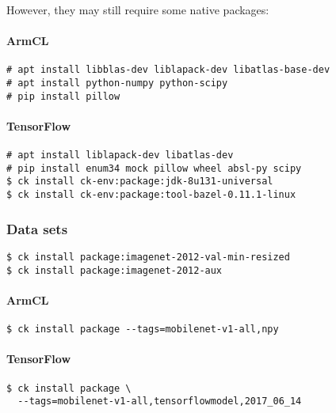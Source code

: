 However, they may still require some native packages:

\paragraph{ArmCL}

\begin{verbatim}
# apt install libblas-dev liblapack-dev libatlas-base-dev
# apt install python-numpy python-scipy
# pip install pillow
\end{verbatim}

\paragraph{TensorFlow}

\begin{verbatim}
# apt install liblapack-dev libatlas-dev
# pip install enum34 mock pillow wheel absl-py scipy
$ ck install ck-env:package:jdk-8u131-universal
$ ck install ck-env:package:tool-bazel-0.11.1-linux
\end{verbatim}

\subsubsection{Data sets}

\begin{verbatim}
$ ck install package:imagenet-2012-val-min-resized
$ ck install package:imagenet-2012-aux
\end{verbatim}

\paragraph{ArmCL}

\begin{verbatim}
$ ck install package --tags=mobilenet-v1-all,npy
\end{verbatim}

\paragraph{TensorFlow}

\begin{verbatim}
$ ck install package \
  --tags=mobilenet-v1-all,tensorflowmodel,2017_06_14 
\end{verbatim}


